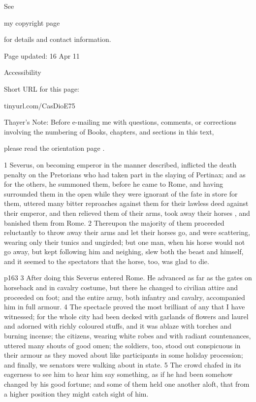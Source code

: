 See

my copyright page

for details and contact information.

Page updated:
16 Apr 11

Accessibility


Short URL for this page:

tinyurl.com/CasDioE75

Thayer's Note: Before e-mailing me with questions, comments, or corrections involving the numbering of Books, chapters, and sections in this text,

please read the orientation page .


1
Severus, on becoming emperor in the manner described, inflicted the death penalty on the Pretorians who had taken part in the slaying of Pertinax; and as for the others, he summoned them, before he came to Rome, and having surrounded them in the open while they were ignorant of the fate in store for them, uttered many bitter reproaches against them for their lawless deed against their emperor, and then relieved them of their arms, took away their horses , and banished them from Rome. 2 Thereupon the majority of them proceeded reluctantly to throw away their arms and let their horses go, and were scattering, wearing only their tunics and ungirded; but one man, when his horse would not go away, but kept following him and neighing, slew both the beast and himself, and it seemed to the spectators that the horse, too, was glad to die.

p163
3
After doing this Severus entered Rome. He advanced as far as the gates on horseback and in cavalry costume, but there he changed to civilian attire and proceeded on foot; and the entire army, both infantry and cavalry, accompanied him in full armour. 4 The spectacle proved the most brilliant of any that I have witnessed; for the whole city had been decked with garlands of flowers and laurel and adorned with richly coloured stuffs, and it was ablaze with torches and burning incense; the citizens, wearing white robes and with radiant countenances, uttered many shouts of good omen; the soldiers, too, stood out conspicuous in their armour as they moved about like participants in some holiday procession; and finally, we senators were walking about in state. 5 The crowd chafed in its eagerness to see him to hear him say something, as if he had been somehow changed by his good fortune; and some of them held one another aloft, that from a higher position they might catch sight of him.


